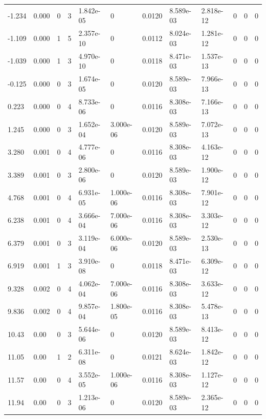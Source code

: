 \documentclass[preview]{standalone}
\begin{document}
{{\begin{tabular}{L{1.2cm}C{1.2cm} C{0.3cm}C{0.5cm} C{1.4cm}C{1.4cm} C{1.4cm}C{1.4cm} C{1.6cm}C{1.6cm} C{1.6cm}C{1.6cm}}
  -1.234  &  0.000  & 0     &  3 &  1.842e-05  & 0  &  0.0120&   8.589e-03& 2.818e-12 & 0   &  0 & 0  \\ 
  -1.109  &  0.000  & 1     &  5 &  2.357e-10  & 0  &  0.0112&   8.024e-03& 1.281e-12 & 0   &  0 & 0  \\ 
  -1.039  &  0.000  & 1     &  3 &  4.970e-10  & 0  &  0.0118&   8.471e-03& 1.537e-13 & 0   &  0 & 0  \\ 
  -0.125  &  0.000  & 0     &  3 &  1.674e-05  & 0  &  0.0120&   8.589e-03& 7.966e-13 & 0   &  0 & 0  \\ 
  0.223  &  0.000  & 0     &  4 &  8.733e-06  & 0  &  0.0116&   8.308e-03& 7.166e-13 & 0   &  0 & 0  \\ 
  1.245  &  0.000  & 0     &  3 &  1.652e-04  & 3.000e-06  &  0.0120&   8.589e-03& 7.072e-13 & 0   &  0 & 0  \\ 
  3.280  &  0.001  & 0     &  4 &  4.777e-06  & 0  &  0.0116&   8.308e-03& 4.163e-12 & 0   &  0 & 0  \\ 
  3.389  &  0.001  & 0     &  3 &  2.800e-06  & 0  &  0.0120&   8.589e-03& 1.900e-12 & 0   &  0 & 0  \\ 
  4.768  &  0.001  & 0     &  4 &  6.931e-05  & 1.000e-06  &  0.0116&   8.308e-03& 7.901e-12 & 0   &  0 & 0  \\ 
  6.238  &  0.001  & 0     &  4 &  3.666e-04  & 7.000e-06  &  0.0116&   8.308e-03& 3.303e-12 & 0   &  0 & 0  \\ 
  6.379  &  0.001  & 0     &  3 &  3.119e-04  & 6.000e-06  &  0.0120&   8.589e-03& 2.530e-13 & 0   &  0 & 0  \\ 
  6.919  &  0.001  & 1     &  3 &  3.910e-08  & 0  &  0.0118&   8.471e-03& 6.309e-12 & 0   &  0 & 0  \\ 
  9.328  &  0.002  & 0     &  4 &  4.062e-04  & 7.000e-06  &  0.0116&   8.308e-03& 3.633e-12 & 0   &  0 & 0  \\ 
  9.836  &  0.002  & 0     &  4 &  9.857e-04  & 1.800e-05  &  0.0116&   8.308e-03& 5.478e-13 & 0   &  0 & 0  \\ 
  10.43  &  0.00  & 0     &  3 &  5.644e-06  & 0  &  0.0120&   8.589e-03& 8.413e-12 & 0   &  0 & 0  \\ 
  11.05  &  0.00  & 1     &  2 &  6.311e-08  & 0  &  0.0121&   8.624e-03& 1.842e-12 & 0   &  0 & 0  \\ 
  11.57  &  0.00  & 0     &  4 &  3.552e-05  & 1.000e-06  &  0.0116&   8.308e-03& 1.127e-12 & 0   &  0 & 0  \\ 
  11.94  &  0.00  & 0     &  3 &  1.213e-06  & 0  &  0.0120&   8.589e-03& 2.365e-12 & 0   &  0 & 0  \\ 

\end{tabular}}}
\end{document}
